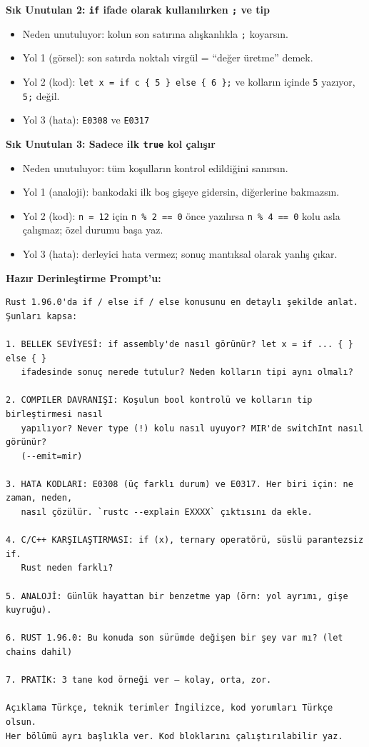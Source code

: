 \documentclass[12pt,a4paper]{article}
\begin{document}
\textbf{Sık Unutulan 2: \texttt{if} ifade olarak kullanılırken \texttt{;} ve tip}

\begin{itemize}
\tightlist
\item
  Neden unutuluyor: kolun son satırına alışkanlıkla \texttt{;} koyarsın.
\item
  Yol 1 (görsel): son satırda noktalı virgül = ``değer üretme'' demek.
\item
  Yol 2 (kod): \texttt{let\ x\ =\ if\ c\ \{\ 5\ \}\ else\ \{\ 6\ \};} ve kolların içinde \texttt{5} yazıyor, \texttt{5;} değil.
\item
  Yol 3 (hata): \texttt{E0308} ve \texttt{E0317}
\end{itemize}

\textbf{Sık Unutulan 3: Sadece ilk \texttt{true} kol çalışır}

\begin{itemize}
\tightlist
\item
  Neden unutuluyor: tüm koşulların kontrol edildiğini sanırsın.
\item
  Yol 1 (analoji): bankodaki ilk boş gişeye gidersin, diğerlerine bakmazsın.
\item
  Yol 2 (kod): \texttt{n\ =\ 12} için \texttt{n\ \%\ 2\ ==\ 0} önce yazılırsa \texttt{n\ \%\ 4\ ==\ 0} kolu asla çalışmaz; özel durumu başa yaz.
\item
  Yol 3 (hata): derleyici hata vermez; sonuç mantıksal olarak yanlış çıkar.
\end{itemize}

\textbf{Hazır Derinleştirme Prompt'u:}

\begin{verbatim}
Rust 1.96.0'da if / else if / else konusunu en detaylı şekilde anlat. Şunları kapsa:

1. BELLEK SEVİYESİ: if assembly'de nasıl görünür? let x = if ... { } else { }
   ifadesinde sonuç nerede tutulur? Neden kolların tipi aynı olmalı?

2. COMPILER DAVRANIŞI: Koşulun bool kontrolü ve kolların tip birleştirmesi nasıl
   yapılıyor? Never type (!) kolu nasıl uyuyor? MIR'de switchInt nasıl görünür?
   (--emit=mir)

3. HATA KODLARI: E0308 (üç farklı durum) ve E0317. Her biri için: ne zaman, neden,
   nasıl çözülür. `rustc --explain EXXXX` çıktısını da ekle.

4. C/C++ KARŞILAŞTIRMASI: if (x), ternary operatörü, süslü parantezsiz if.
   Rust neden farklı?

5. ANALOJİ: Günlük hayattan bir benzetme yap (örn: yol ayrımı, gişe kuyruğu).

6. RUST 1.96.0: Bu konuda son sürümde değişen bir şey var mı? (let chains dahil)

7. PRATİK: 3 tane kod örneği ver — kolay, orta, zor.

Açıklama Türkçe, teknik terimler İngilizce, kod yorumları Türkçe olsun.
Her bölümü ayrı başlıkla ver. Kod bloklarını çalıştırılabilir yaz.
\end{verbatim}
\end{document}
